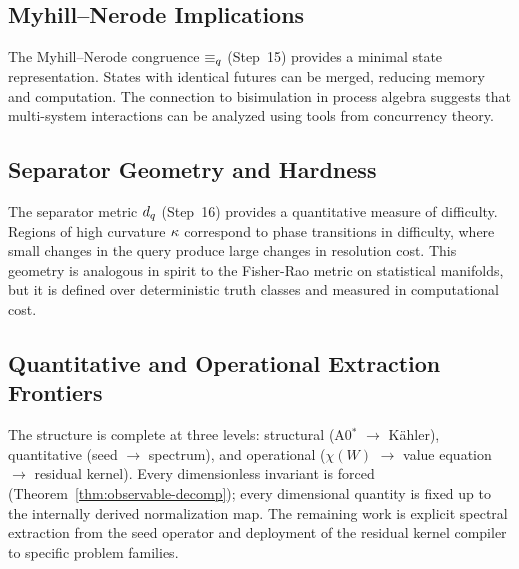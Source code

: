 \subsection{Myhill--Nerode Implications}
\label{sec:discussion:myhill-nerode}

The Myhill--Nerode congruence $\equiv_q$ (Step~15) provides a minimal
state representation. States with identical futures can be merged, reducing
memory and computation. The connection to bisimulation in process algebra
suggests that multi-system interactions can be analyzed using tools from
concurrency theory.

\subsection{Separator Geometry and Hardness}
\label{sec:discussion:geometry}

The separator metric $d_q$ (Step~16) provides a quantitative measure
of difficulty. Regions of high curvature $\kappa$ correspond to
phase transitions in difficulty, where small changes in the query produce
large changes in resolution cost. This geometry is analogous in spirit to the
Fisher-Rao metric on statistical manifolds, but it is defined over
deterministic truth classes and measured in computational cost.

\subsection{Quantitative and Operational Extraction Frontiers}
\label{sec:discussion:frontiers}

The structure is complete at three levels: structural (A0$^*$ $\to$ K\"{a}hler),
quantitative (seed $\to$ spectrum), and operational ($\chi(W)$ $\to$
value equation $\to$ residual kernel).  Every dimensionless invariant is
forced (Theorem~\ref{thm:observable-decomp}); every dimensional quantity is
fixed up to the internally derived normalization map.  The remaining work
is explicit spectral extraction from the seed operator and deployment of
the residual kernel compiler to specific problem families.

